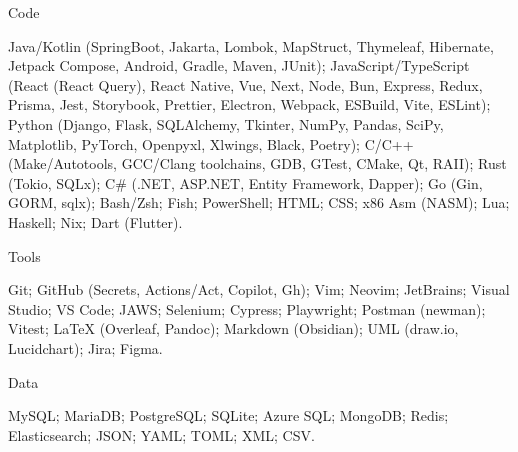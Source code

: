 \documentclass[10pt, a4paper]{russell}
\begin{document}
\makecvheader
\makecvfooter{\today}{}{\thepage}

\begin{cvskills}

    \cvskill
        {Code}
        {\parbox[t]{0.99\linewidth}{
            Java/Kotlin (SpringBoot, Jakarta, Lombok, MapStruct, Thymeleaf, Hibernate, Jetpack Compose, Android, Gradle, Maven, JUnit); 
            JavaScript/TypeScript (React (React Query), React Native, Vue, Next, Node, Bun, Express, Redux, Prisma, Jest, Storybook, Prettier, Electron, Webpack, ESBuild, Vite, ESLint); 
            Python (Django, Flask, SQLAlchemy, Tkinter, NumPy, Pandas, SciPy, Matplotlib, PyTorch, Openpyxl, Xlwings, Black, Poetry);
            C/C++ (Make/Autotools, GCC/Clang toolchains, GDB, GTest, CMake, Qt, RAII);
            Rust (Tokio, SQLx);
            C\# (.NET, ASP.NET, Entity Framework, Dapper); 
            Go (Gin, GORM, sqlx);
            Bash/Zsh;
            Fish;
            PowerShell;
            HTML;
            CSS;
            x86 Asm (NASM);
            Lua;
            Haskell;
            Nix;
            Dart (Flutter).
        }}

    \cvskill
        {Tools}
        {\parbox[t]{0.99\linewidth}{
            Git;  
            GitHub (Secrets, Actions/Act, Copilot, Gh);  
            Vim;  
            Neovim;  
            JetBrains;  
            Visual Studio;  
            VS Code;  
            JAWS;  
            Selenium;  
            Cypress;  
            Playwright;  
            Postman (newman);  
            Vitest;    
            LaTeX (Overleaf, Pandoc);  
            Markdown (Obsidian);  
            UML (draw.io, Lucidchart);  
            Jira;  
            Figma.
        }}

    \cvskill
        {Data}
        {\parbox[t]{0.99\linewidth}{
            MySQL;
            MariaDB;  
            PostgreSQL;  
            SQLite;  
            Azure SQL;
            MongoDB;  
            Redis;
            Elasticsearch;
            JSON;  
            YAML;  
            TOML;  
            XML;  
            CSV.
        }}


\end{cvskills}
\end{document}
